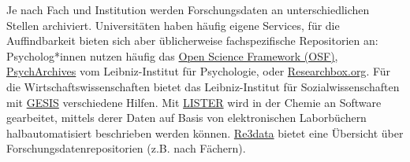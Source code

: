 \documentclass[
  letterpaper,
  DIV=11,
  numbers=noendperiod]{scrreprt}
\begin{document}
\begin{tcolorbox}[enhanced jigsaw, title=\textcolor{quarto-callout-note-color}{\faInfo}\hspace{0.5em}{Wo werden Forschungsdaten hochgeladen?}, colbacktitle=quarto-callout-note-color!10!white, rightrule=.15mm, titlerule=0mm, left=2mm, bottomrule=.15mm, arc=.35mm, leftrule=.75mm, toprule=.15mm, opacityback=0, breakable, bottomtitle=1mm, colframe=quarto-callout-note-color-frame, toptitle=1mm, opacitybacktitle=0.6, coltitle=black, colback=white]

Je nach Fach und Institution werden Forschungsdaten an unterschiedlichen
Stellen archiviert. Universitäten haben häufig eigene Services, für die
Auffindbarkeit bieten sich aber üblicherweise fachspezifische
Repositorien an: Psycholog*innen nutzen häufig das
\href{https://osf.io/}{Open Science Framework (OSF)},
\href{https://www.psycharchives.org}{PsychArchives} vom Leibniz-Institut
für Psychologie, oder \href{researchbox.org}{Researchbox.org}. Für die
Wirtschaftswissenschaften bietet das Leibniz-Institut für
Sozialwissenschaften mit
\href{https://www.gesis.org/datenservices/daten-teilen}{GESIS}
verschiedene Hilfen. Mit
\href{https://www.nfdi4chem.de/de/lister-halbautomatische-metadatenextraktion-aus-kommentierter-experimentdokumentation-in-elabftw/}{LISTER}
wird in der Chemie an Software gearbeitet, mittels derer Daten auf Basis
von elektronischen Laborbüchern halbautomatisiert beschrieben werden
können. \href{https://www.re3data.org}{Re3data} bietet eine Übersicht
über Forschungsdatenrepositorien (z.B. nach Fächern).


\end{tcolorbox}
\end{document}
